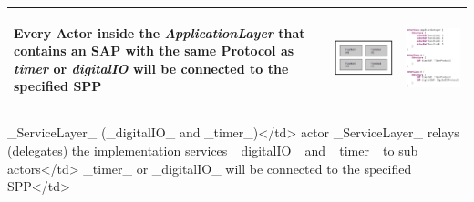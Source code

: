 \begin{table}
\begin{tabular}{|m{3cm}|c|c|}
 \begin{flushleft}Every Actor inside the \textit{ApplicationLayer} that contains an SAP with the same 
Protocol as \textit{timer} or \textit{digitalIO} will be connected to the specified SPP\end{flushleft} & 
\includegraphics[scale=0.5]{images/040-LayeringApplicationLayer.png} & 
\includegraphics[scale=0.5]{images/040-LayeringApplicationLayerTextual.png} \\ \hline
\end{tabular}
\end{table}

_ServiceLayer_  (_digitalIO_ and _timer_)</td>
actor _ServiceLayer_ relays (delegates) the implementation services _digitalIO_ and _timer_ to sub 
actors</td>
_timer_ or _digitalIO_ will be connected to the specified SPP</td>

